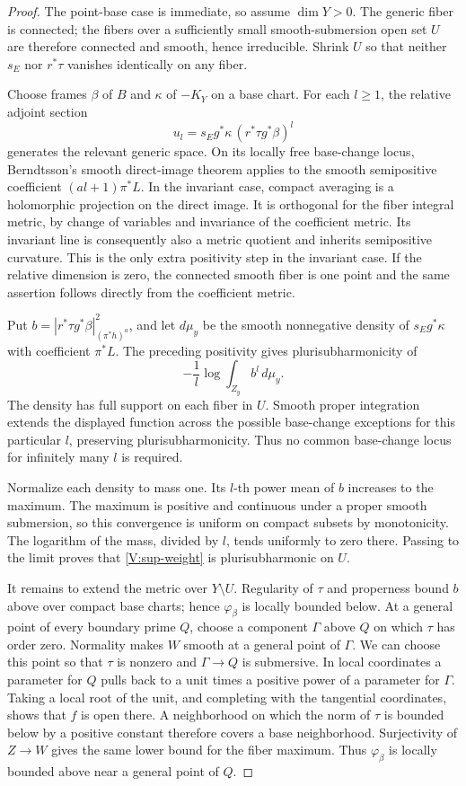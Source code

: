 \begin{proof}
The point-base case is immediate, so assume $\dim Y>0$.
The generic fiber is connected; the fibers over a sufficiently
small smooth-submersion open set $U$ are therefore connected and
smooth, hence irreducible.  Shrink $U$ so that neither $s_E$ nor
$r^*\tau$ vanishes identically on any fiber.

Choose frames $\beta$ of $B$ and $\kappa$ of $-K_Y$ on a base
chart.  For each $l\ge1$, the relative adjoint section
\[
 u_l=s_Eg^*\kappa\,(r^*\tau g^*\beta)^l
\]
generates the relevant generic space.  On its locally free
base-change locus, Berndtsson's smooth direct-image theorem
\cite[Theorem~1.2]{Berndtsson2009} applies to the smooth
semipositive coefficient $(al+1)\pi^*L$.  In the invariant case,
compact averaging is a holomorphic projection on the direct image.
It is orthogonal for the fiber integral metric, by change of
variables and invariance of the coefficient metric.  Its invariant
line is consequently also a metric quotient and inherits
semipositive curvature.  This is the only extra positivity step in
the invariant case.  If the relative dimension is zero, the
connected smooth fiber is one point and the same assertion follows
directly from the coefficient metric.

Put $b=|r^*\tau g^*\beta|^2_{(\pi^*h)^a}$, and let $d\mu_y$
be the smooth nonnegative density of $s_Eg^*\kappa$ with
coefficient $\pi^*L$.  The preceding positivity gives
plurisubharmonicity of
\[
 -\frac1l\log\int_{Z_y}b^l\,d\mu_y.
\]
The density has full support on each fiber in $U$.  Smooth proper
integration extends the displayed function across the possible
base-change exceptions for this particular $l$, preserving
plurisubharmonicity.  Thus no common base-change locus for infinitely
many $l$ is required.

Normalize each density to mass one.  Its $l$-th power mean of $b$
increases to the maximum.  The maximum is positive and continuous
under a proper smooth submersion, so this convergence is uniform
on compact subsets by monotonicity.  The logarithm of the mass,
divided by $l$, tends uniformly to zero there.  Passing to the
limit proves that \eqref{V:sup-weight} is plurisubharmonic on $U$.

It remains to extend the metric over $Y\setminus U$.  Regularity
of $\tau$ and properness bound $b$ above over compact base charts;
hence $\varphi_\beta$ is locally bounded below.  At a general point
of every boundary prime $Q$, choose a component $\Gamma$ above
$Q$ on which $\tau$ has order zero.  Normality makes $W$ smooth
at a general point of $\Gamma$.  We can choose this point so that
$\tau$ is nonzero and $\Gamma\to Q$ is submersive.  In local
coordinates a parameter for $Q$ pulls back to a unit times a
positive power of a parameter for $\Gamma$.  Taking a local root
of the unit, and completing with the tangential coordinates, shows
that $f$ is open there.  A neighborhood on which the norm of
$\tau$ is bounded below by a positive constant therefore covers
a base neighborhood.  Surjectivity of $Z\to W$ gives the same
lower bound for the fiber maximum.  Thus $\varphi_\beta$ is
locally bounded above near a general point of $Q$.


\end{proof}
